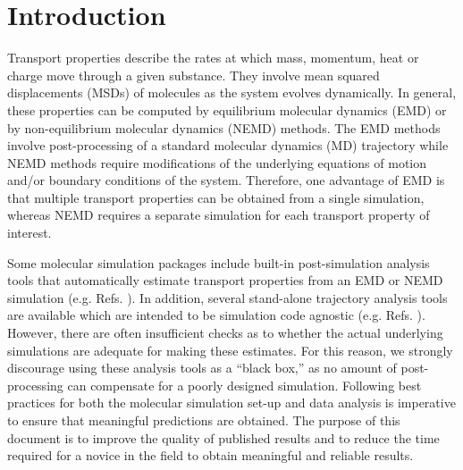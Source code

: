 \documentclass[9pt,bestpractices]{livecoms}
\begin{document}
\section{Introduction}

Transport properties describe the rates at which mass, momentum, heat or charge move through a given substance. They involve mean squared displacements (MSDs) of molecules as the system evolves dynamically. In general, these properties can be computed by equilibrium molecular dynamics (EMD) or by non-equilibrium molecular dynamics (NEMD) methods. The EMD methods involve post-processing of a standard molecular dynamics (MD) trajectory while NEMD methods require modifications of the underlying equations of motion and/or boundary conditions of the system. Therefore, one advantage of EMD is that multiple transport properties can be obtained from a single simulation, whereas NEMD requires a separate simulation for each transport property of interest.

Some molecular simulation packages include built-in post-simulation analysis tools that automatically estimate transport properties from an EMD or NEMD simulation (e.g. Refs. \cite{LAMMPS,GROMACS,AMBER2018,NAMD}). In addition, several stand-alone trajectory analysis tools are available which are intended to be simulation code agnostic (e.g. Refs. \cite{Roe2013,MDTraj,VMD}). However, there are often insufficient checks as to whether the actual underlying simulations are adequate for making these estimates. For this reason, we strongly discourage using these analysis tools as a ``black box,'' as no amount of post-processing can compensate for a poorly designed simulation. Following best practices for both the molecular simulation set-up and data analysis is imperative to ensure that meaningful predictions are obtained. The purpose of this document is to improve the quality of published results and to reduce the time required for a novice in the field to obtain meaningful and reliable results.
\end{document}
